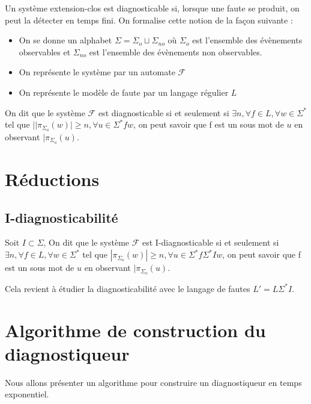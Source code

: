 \documentclass[10pt,a4paper]{article}
\begin{document}
Un syst\`eme extension-clos est diagnosticable si, lorsque une faute se produit, on peut la détecter en temps fini. On formalise cette notion de la fa\c{c}on suivante :
\begin{itemize}
	\item On se donne un alphabet $\Sigma=\Sigma_o\sqcup\Sigma_{no}$ o\`u $\Sigma_o$ est l'ensemble des \'ev\`enements observables et $\Sigma_{no}$ est l'ensemble des \'ev\`enements non observables.
	\item On repr\'esente le syst\`eme par un automate $\mathcal F$
	\item On repr\'esente le mod\`ele de faute par un langage r\'egulier $L$
\end{itemize}

On dit que le système $\mathcal F$ est diagnosticable si et seulement si $\exists n, \forall  f \in L, \forall w \in \Sigma^*$ tel que $||\pi_{\Sigma_o}(w)| \geq n, \forall u \in \Sigma^* f w$, on peut savoir que f est un sous mot de $u$ en observant $|\pi_{\Sigma_o}(u)$. 


\section{R\'eductions}

\subsection{I-diagnosticabilit\'e}


Soit $I \subset \Sigma$, On dit que le système $\mathcal F$ est I-diagnosticable si et seulement si $\exists n, \forall  f \in L, \forall w \in \Sigma^*$ tel que $|\pi_{\Sigma_o}(w)| \geq n, \forall u \in \Sigma^*f \Sigma^* I w$, on peut savoir que f est un sous mot de $u$ en observant $|\pi_{\Sigma_o}(u)$. 


Cela revient à étudier la diagnosticabilité avec le langage de fautes $L'=L \Sigma^* I$.



\section{Algorithme de construction du diagnostiqueur}
    Nous allons présenter un algorithme pour construire un diagnostiqueur en temps exponentiel.
\end{document}
